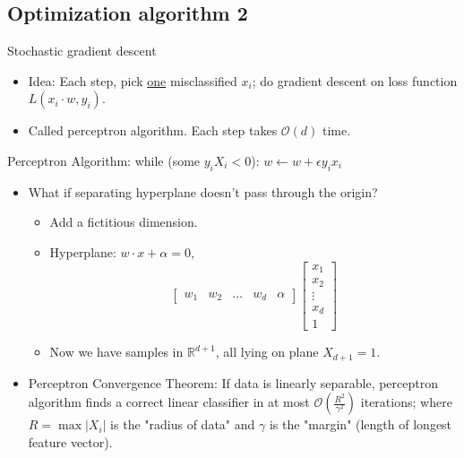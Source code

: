 \documentclass[10pt]{article}
\begin{document}
	\subsection*{Optimization algorithm 2} Stochastic gradient descent
		\
		\begin{itemize}
			\item Idea: Each step, pick \underline{one} misclassified $x_{i}$; do gradient descent on loss function $L(x_{i} \cdot w, y_{i})$.
			\item Called perceptron algorithm. Each step takes $\mathcal{O}(d)$ time.
			\end{itemize}
\begin{codeblock}
	Perceptron Algorithm:
	    while (some $y_{i}X_{i} < 0$):
		    $w \leftarrow w + \epsilon y_{i}x_{i}$
\end{codeblock}
		\begin{itemize}
		\item What if separating hyperplane doesn't pass through the origin?
			\begin{itemize}
				\item Add a fictitious dimension.
				\item Hyperplane: $w \cdot x + \alpha = 0$,
					$$
						\begin{bmatrix} w_{1} & w_{2} & \dots & w_{d} & \alpha \end{bmatrix}
						\begin{bmatrix}
 							x_{1} \\
 							x_{2} \\
 							\vdots \\
 							x_{d}	\\
 							1
 						\end{bmatrix}
					$$
				\item Now we have samples in $\mathbb{R}^{d+1}$, all lying on plane $X_{d+1} = 1$.
			\end{itemize}
		
		\item Perceptron Convergence Theorem: If data is linearly separable, perceptron algorithm finds a correct linear classifier in at most $\mathcal{O}(\frac{R^{2}}{\gamma^{2}})$ iterations; where $R = \max |X_{i}|$ is the "radius of data" and $\gamma$ is the "margin"  (length of longest feature vector).
		\end{itemize}
		
\end{document}
